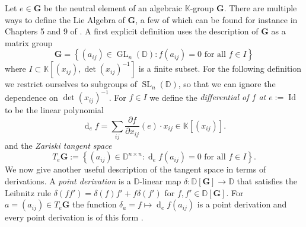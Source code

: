 \documentclass[12pt]{amsart}
\newcommand{\D}{\mathbb{D} }
\newcommand{\K}{\mathbb{K}}
\newcommand{\bG}{\mathbf{G}}
\numberwithin{equation}{section}
\theoremstyle{remark} %
\begin{document}
Let $e\in \bG$ be the neutral element of an algebraic $\K$-group $\bG$. There are multiple ways to define the Lie Algebra of $\bG$, a few of which can be found for instance in Chapters 5 and 9 of \cite{Hum1}. A first explicit definition uses the description of $\bG$ as a matrix group
$$
\bG = \left\{ (a_{ij}) \in \operatorname{GL}_n(\D) \colon f(a_{ij}) = 0 \text{ for all } f \in I \right\}
$$
where $I \subset \K[(x_{ij}),\det(x_{ij})^{-1}]$ is a finite subset. For the following definition we restrict ourselves to subgroups of $\operatorname{SL}_n(\D)$, so that we can ignore the dependence on $\operatorname{det}(x_{ij})^{-1}$. For $f \in I$ we define the \emph{differential of $f$ at $e:=\operatorname{Id}$} to be the linear polynomial
$$
\operatorname{d}_{e}\!f = \sum_{ij}  \frac{\partial f}{\partial x_{ij}} (e) \cdot x_{ij} \in \K[(x_{ij})]. 
$$
and the \emph{Zariski tangent space}  
$$
T_e\bG := \left\{ (a_{ij}) \in \D^{n\times n} \colon  \operatorname{d}_e\!f(a_{ij}) = 0 \text{ for all } f \in I\right\}.
$$
We now give another useful description of the tangent space in terms of derivations. A \emph{point derivation} is a $\D$-linear map $\delta \colon \D[\bG] \to \D$ that satisfies the Leibnitz rule $\delta(f f') = \delta(f) f' + f \delta(f')$ for $f,f' \in \D[\bG]$. For $a = (a_{ij}) \in T_e\bG$ the function $\delta_a = f \mapsto \operatorname{d}_e\!f(a_{ij})$ is a point derivation and every point derivation is of this form \cite[Section 5.1]{Hum1}. 
\end{document}
